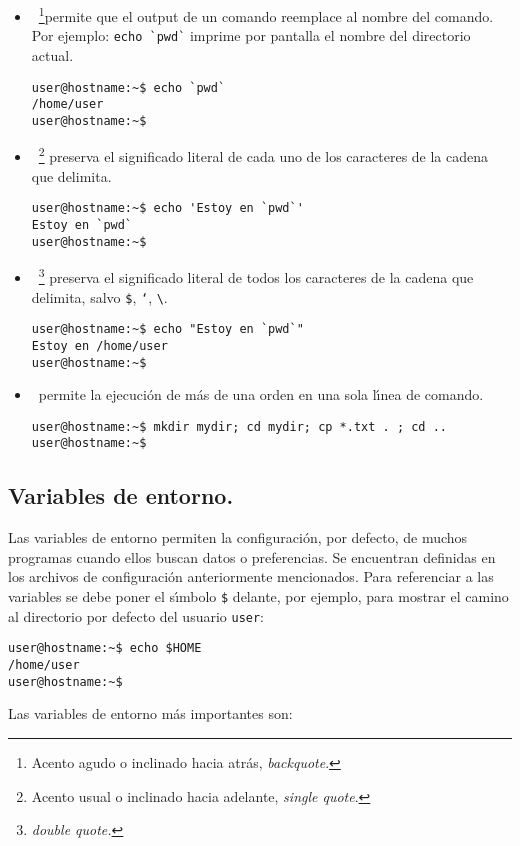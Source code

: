 \begin{itemize}
  
\item {}\ \footnote{Acento agudo o inclinado hacia
    atr{\'a}s, {\it backquote}.}permite que el output de un comando reemplace al nombre del
  comando. Por ejemplo: \verb+echo `pwd`+ imprime por pantalla el
  nombre del directorio actual.
\begin{verbatim}
user@hostname:~$ echo `pwd`
/home/user
user@hostname:~$
\end{verbatim}
  
\item {}\ \footnote{Acento usual o inclinado hacia adelante,
    {\it single quote}.}
preserva el  significado literal de cada uno de los caracteres de la
cadena que delimita.
\begin{verbatim}
user@hostname:~$ echo 'Estoy en `pwd`'
Estoy en `pwd`
user@hostname:~$
\end{verbatim}

\item {}\  \footnote{\it double quote.} preserva el
  significado literal de todos los caracteres de la cadena que
  delimita, salvo {\tt \$}, {\tt `}, \verb+\+.
\begin{verbatim}
user@hostname:~$ echo "Estoy en `pwd`"
Estoy en /home/user
user@hostname:~$
\end{verbatim}

\item \comando{;}\ permite la ejecuci{\'o}n  de m{\'a}s de una orden
  en una
sola l{\'\i}nea de comando.
\begin{verbatim}
user@hostname:~$ mkdir mydir; cd mydir; cp *.txt . ; cd ..
user@hostname:~$
\end{verbatim}

\end{itemize}


\subsection{ Variables de entorno.}

Las variables de entorno permiten la configuraci{\'o}n, por defecto, de
muchos programas cuando ellos buscan datos o preferencias.  Se
encuentran definidas en los archivos de configuraci{\'o}n anteriormente
mencionados. Para referenciar a las variables se debe poner el s{\'\i}mbolo
{\tt \$} delante, por ejemplo, para mostrar el camino al directorio por
defecto del usuario \verb+user+:
\begin{verbatim}
user@hostname:~$ echo $HOME 
/home/user
user@hostname:~$
\end{verbatim}
Las variables de entorno m{\'a}s importantes son:

